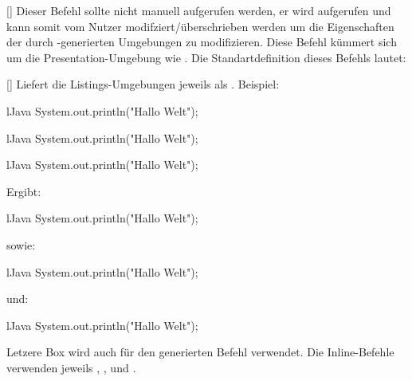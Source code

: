 %
%
%
[\secline{}]
Dieser Befehl sollte nicht manuell aufgerufen werden, er wird aufgerufen und kann somit vom Nutzer modifziert/überschrieben werden um die Eigenschaften der durch -generierten Umgebungen zu modifizieren. Diese Befehl kümmert sich um die Presentation-Umgebung wie .
Die Standartdefinition dieses Befehls lautet:
%
%
%
[\cmdlist\secline{}\cmdlist\secline{}]
Liefert die Listings-Umgebungen jeweils als . Beispiel:
\begin{latex}[morekeywords={[3]{plainlst,defaultlst}}]
\begin{defaultlst}{lJava}
System.out.println("Hallo Welt");
\end{defaultlst}
\begin{plainlst}{lJava}
System.out.println("Hallo Welt");
\end{plainlst}
\begin{presentlst}{lJava}
System.out.println("Hallo Welt");
\end{presentlst}
\end{latex}
Ergibt:
\begin{defaultlst}{lJava}
System.out.println("Hallo Welt");
\end{defaultlst}
sowie:
\begin{plainlst}{lJava}
System.out.println("Hallo Welt");
\end{plainlst}
und:
\begin{presentlst}{lJava}
System.out.println("Hallo Welt");
\end{presentlst}
Letzere Box wird auch für den generierten Befehl verwendet. Die Inline-Befehle verwenden jeweils , ,  und .

